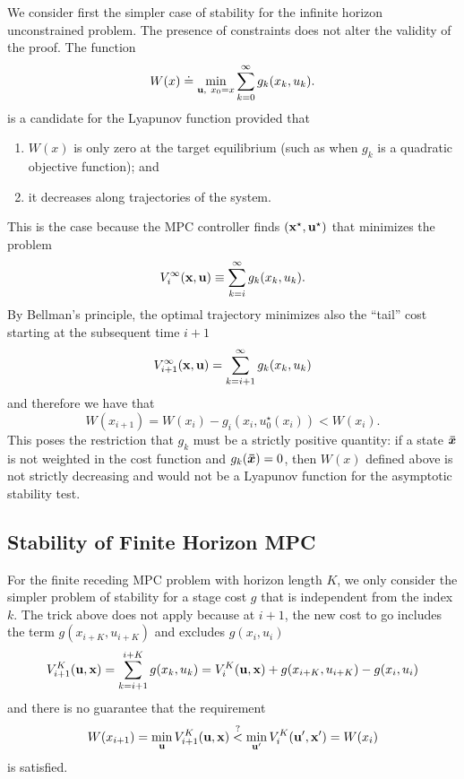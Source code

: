 We consider first the simpler case of stability for the infinite horizon unconstrained problem. The presence of constraints does not alter the validity of the proof. The function
\begin{equation*}
  W(x) \doteq \min_{\boldsymbol{\mathrm{u}},\ x_0=x} \sum_{k=0}^\infty g_k(x_k,u_k).
\end{equation*}
is a candidate for the Lyapunov function provided that
\begin{enumerate}[itemsep=-0.5ex]
\item $W(x)$ is only zero at the target equilibrium (such as when $g_k$ is a quadratic objective function); and
\item it decreases along trajectories of the system.
\end{enumerate}
This is the case because the MPC controller finds $(\boldsymbol{\mathrm{x}}^\star, \boldsymbol{\mathrm{u}}^\star)$ that minimizes the problem
\begin{equation*}
  V^\infty_i(\boldsymbol{\mathrm{x}},\boldsymbol{\mathrm{u}}) \equiv \sum_{k=i}^\infty g_k(x_k,u_k).
\end{equation*}
By Bellman's principle, the optimal trajectory minimizes also the ``tail'' cost starting at the subsequent time $i+1$
\begin{equation*}
  V_{i+1}^\infty(\boldsymbol{\mathrm{x}},\boldsymbol{\mathrm{u}}) = \sum_{k=i+1}^\infty g_k(x_k,u_k)
\end{equation*}
and therefore we have that
\begin{equation*}
  W(x_{i+1}) = W(x_i) - g_i(x_i,u_0^\star(x_i)) < W(x_i).
\end{equation*}
This poses the restriction that $g_k$ must be a strictly positive quantity: if a state $\boldsymbol{\bar{x}}$ is not weighted in the cost function and $g_k(\boldsymbol{\bar{x}})=0$, then $W(x)$ defined above is not strictly decreasing and would not be a Lyapunov function for the asymptotic stability test.

\subsection{Stability of Finite Horizon MPC}
\label{sec:stability-finite-horizon-MPC}

For the finite receding MPC problem with horizon length $K$, we only consider the simpler problem of stability for a stage cost $g$ that is independent from the index $k$. The trick above does not apply because at $i+1$, the new cost to go includes the term $g(x_{i+K},u_{i+K})$ and excludes $g(x_i,u_i)$
\begin{equation*}
  V^K_{i+1}(\boldsymbol{\mathrm{u}},\boldsymbol{\mathrm{x}}) = \sum_{k=i+1}^{i+K}g(x_k,u_k) = V_i^K(\boldsymbol{\mathrm{u}},\boldsymbol{\mathrm{x}}) + g(x_{i+K},u_{i+K}) - g(x_i,u_i)
\end{equation*}
and there is no guarantee that the requirement
\begin{equation*}
  W(x_{i+1}) = \min_{\boldsymbol{\mathrm{u}}} V^K_{i+1}(\boldsymbol{\mathrm{u}},\boldsymbol{\mathrm{x}}) \stackrel{?}{<} \min_{\boldsymbol{\mathrm{u}}'} V^K_i(\boldsymbol{\mathrm{u}}^\prime,\boldsymbol{\mathrm{x}}^\prime) = W(x_i)
\end{equation*}
is satisfied.

